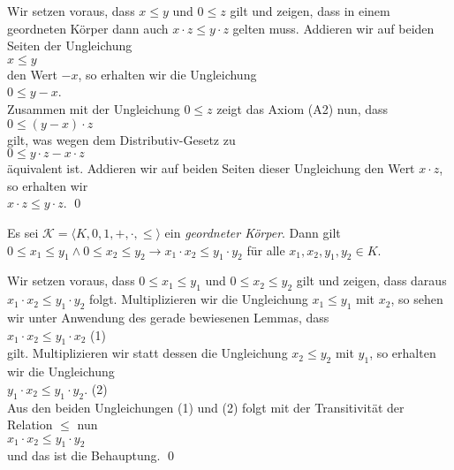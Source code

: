 \proof
Wir setzen voraus, dass  $x \leq y$ und $0 \leq z$ gilt und zeigen, dass in einem geordneten
K\"orper dann auch $x \cdot z \leq y \cdot z$ gelten muss.  Addieren wir auf beiden Seiten der Ungleichung
\\[0.2cm]
\hspace*{1.3cm}
$x \leq y$
\\[0.2cm]
den Wert $-x$, so erhalten wir die Ungleichung
\\[0.2cm]
\hspace*{1.3cm}
$0 \leq y - x$.
\\[0.2cm]
Zusammen mit der Ungleichung $0 \leq z$ zeigt das Axiom (A2) nun, dass
\\[0.2cm]
\hspace*{1.3cm}
$0 \leq (y - x) \cdot z$
\\[0.2cm]
gilt, was wegen dem Distributiv-Gesetz zu
\\[0.2cm]
\hspace*{1.3cm}
$0 \leq y \cdot z - x \cdot z$
\\[0.2cm]
\"aquivalent ist.  Addieren wir auf beiden Seiten dieser Ungleichung den Wert $x \cdot z$, so erhalten wir
\\[0.2cm]
\hspace*{1.3cm}
$x \cdot z \leq y \cdot z$.  \qed

\begin{Lemma} \label{lemma:l7}
  Es sei  $\mathcal{K} = \langle K, 0, 1, +, \cdot, \leq \rangle$ ein \emph{geordneter K\"orper}.
  Dann gilt
  \\[0.2cm]
  \hspace*{1.3cm} $0 \leq x_1 \leq y_1 \wedge 0 \leq x_2 \leq y_2 \rightarrow x_1 \cdot x_2 \leq y_1 \cdot y_2$  
  \quad f\"ur alle $x_1,x_2,y_1,y_2 \in K$.
\end{Lemma}

\proof
Wir setzen voraus, dass $0 \leq x_1 \leq y_1$ und $0 \leq x_2 \leq y_2$ gilt und zeigen, dass daraus 
$x_1 \cdot x_2 \leq y_1 \cdot y_2$ folgt.  Multiplizieren wir die Ungleichung $x_1 \leq y_1$ mit
$x_2$, so sehen wir unter Anwendung des gerade bewiesenen Lemmas, dass
\\[0.2cm]
\hspace*{1.3cm}
$x_1 \cdot x_2 \leq y_1 \cdot x_2$  \hspace*{\fill} (1)
\\[0.2cm]
gilt.  Multiplizieren wir statt dessen die Ungleichung $x_2 \leq y_2$ mit $y_1$, so erhalten wir die
Ungleichung 
\\[0.2cm]
\hspace*{1.3cm}
$y_1 \cdot x_2 \leq y_1 \cdot y_2$. \hspace*{\fill} (2)
\\[0.2cm]
Aus den beiden Ungleichungen (1) und (2) folgt mit der Transitivit\"at der Relation $\leq$ nun
\\[0.2cm]
\hspace*{1.3cm}
$x_1 \cdot x_2 \leq y_1 \cdot y_2$
\\[0.2cm]
und das ist die Behauptung.  \qed

